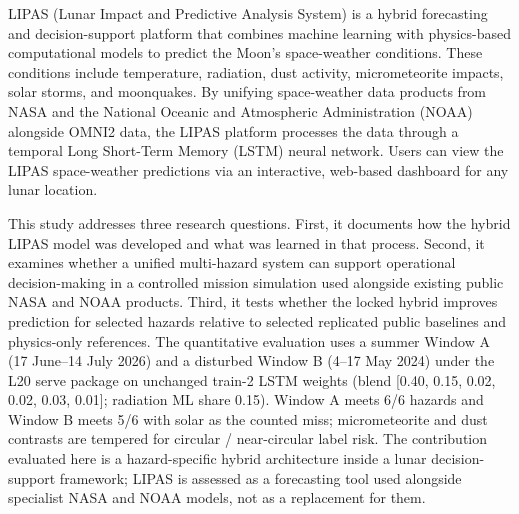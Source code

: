 LIPAS (Lunar Impact and Predictive Analysis System) is a hybrid forecasting and decision-support platform that combines machine learning with physics-based computational models to predict the Moon's space-weather conditions. These conditions include temperature, radiation, dust activity, micrometeorite impacts, solar storms, and moonquakes. By unifying space-weather data products from NASA and the National Oceanic and Atmospheric Administration (NOAA) alongside OMNI2 data, the LIPAS platform processes the data through a temporal Long Short-Term Memory (LSTM) neural network. Users can view the LIPAS space-weather predictions via an interactive, web-based dashboard for any lunar location.

This study addresses three research questions. First, it documents how the hybrid LIPAS model was developed and what was learned in that process. Second, it examines whether a unified multi-hazard system can support operational decision-making in a controlled mission simulation used alongside existing public NASA and NOAA products. Third, it tests whether the locked hybrid improves prediction for selected hazards relative to selected replicated public baselines and physics-only references. The quantitative evaluation uses a summer Window A (17 June--14 July 2026) and a disturbed Window B (4--17 May 2024) under the L20 serve package on unchanged train-2 LSTM weights (blend [0.40, 0.15, 0.02, 0.02, 0.03, 0.01]; radiation ML share 0.15). Window A meets 6/6 hazards and Window B meets 5/6 with solar as the counted miss; micrometeorite and dust contrasts are tempered for circular / near-circular label risk. The contribution evaluated here is a hazard-specific hybrid architecture inside a lunar decision-support framework; LIPAS is assessed as a forecasting tool used alongside specialist NASA and NOAA models, not as a replacement for them.
